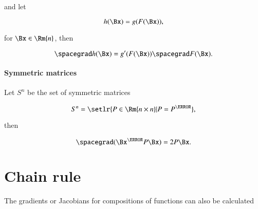 and let

\begin{dmath}\label{eqn:jacobianAndHessian:544}
h(\Bx) = g(F(\Bx)),
\end{dmath}

for \( \Bx \in \Rm{n} \), then

\begin{dmath}\label{eqn:jacobianAndHessian:564}
\spacegrad h(\Bx)
=
g'(F(\Bx)) \spacegrad F(\Bx).
\end{dmath}



\paragraph{Symmetric matrices}

Let \( S^n \) be the set of symmetric matrices

\begin{equation}\label{eqn:jacobianAndHessian:444}
S^n = \setlr{ P \in \Rm{n\times n} | P = P^\T},
\end{equation}

then

\begin{dmath}\label{eqn:jacobianAndHessian:464}
\spacegrad (\Bx^\T P \Bx) = 2 P \Bx.
\end{dmath}

\section{Chain rule}

The gradients or Jacobians for compositions of functions can also be calculated


